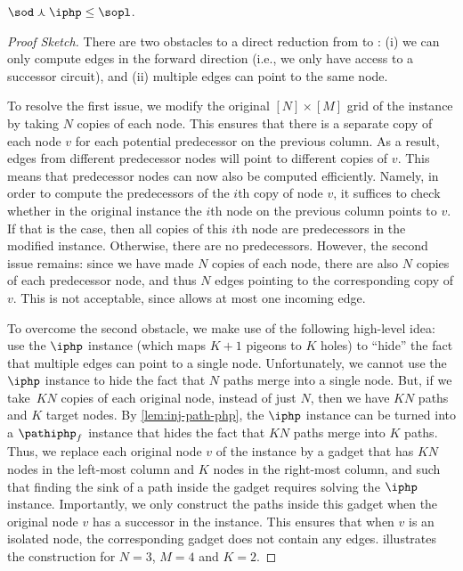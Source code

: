 \begin{lemma}
$\sod\curlywedge\iphp \leq \sopl$.
\label{lem:iphp_or_iter_reduces_to_sopl}
\end{lemma}

\begin{proof}[Proof Sketch]
There are two obstacles to a direct reduction from \sod to \sopl: (i) we can only compute edges in the forward direction (i.e., we only have access to a successor circuit), and (ii) multiple edges can point to the same node.

To resolve the first issue, we modify the original $[N] \times [M]$ grid of the \sod instance by taking $N$ copies of each node. This ensures that there is a separate copy of each node $v$ for each potential predecessor on the previous column. As a result, edges from different predecessor nodes will point to different copies of $v$. This means that predecessor nodes can now also be computed efficiently. Namely, in order to compute the predecessors of the $i$th copy of node $v$, it suffices to check whether in the original \sod instance the $i$th node on the previous column points to $v$. If that is the case, then all copies of this $i$th node are predecessors in the modified instance. Otherwise, there are no predecessors. However, the second issue remains: since we have made $N$ copies of each node, there are also $N$ copies of each predecessor node, and thus $N$ edges pointing to the corresponding copy of $v$. This is not acceptable, since \sopl allows at most one incoming edge.

To overcome the second obstacle, we make use of the following high-level idea: use the $\iphp$ instance (which maps $K+1$ pigeons to $K$ holes) to ``hide'' the fact that multiple edges can point to a single node. Unfortunately, we cannot use the $\iphp$ instance to hide the fact that $N$ paths merge into a single node. But, if we take~$K N$ copies of each original node, instead of just $N$, then we have $KN$ paths and $K$ target nodes. By \cref{lem:inj-path-php}, the $\iphp$ instance can be turned into a $\pathiphp_f$ instance that hides the fact that $KN$ paths merge into $K$ paths. Thus, we replace each original node $v$ of the \sod instance by a gadget that has $KN$ nodes in the left-most column and $K$ nodes in the right-most column, and such that finding the sink of a path inside the gadget requires solving the $\iphp$ instance. Importantly, we only construct the paths inside this gadget when the original node $v$ has a successor in the \sod instance. This ensures that when $v$ is an isolated node, the corresponding gadget does not contain any edges.  illustrates the construction for $N=3$, $M=4$ and $K=2$.


\end{proof}
